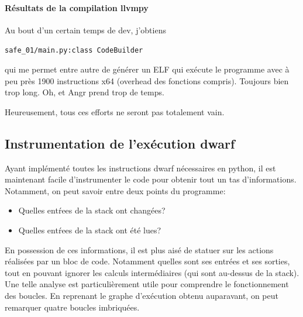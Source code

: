 \documentclass[14pt]{article}
\newcommand{\inlinebox}[2]{%
\colorbox{bg}{%
\parbox[b][0.6em]{\widthof{\texttt{#2}}}{\texttt{#2}}
}
}
\newcommand{\inlinebash}[1]{ \inlinebox{bash}{#1} }
\theoremstyle{definition}
\begin{document}
\paragraph{Résultats de la compilation llvmpy \\ }

Au bout d'un certain temps de dev, j'obtiens \inlinebash{safe_01/main.py:class CodeBuilder} qui me permet entre autre de générer un ELF qui exécute le programme avec à peu près 1900 instructions x64 (overhead des fonctions compris). Toujours bien trop long. Oh, et Angr prend trop de temps.

Heureusement, tous ces efforts ne seront pas totalement vain.

\subsection{Instrumentation de l'exécution dwarf}

Ayant implémenté toutes les instructions dwarf nécessaires en python, il est maintenant facile d'instrumenter le code pour obtenir tout un tas d'informations.
Notamment, on peut savoir entre deux points du programme:
\begin{itemize}
    \item Quelles entŕees de la stack ont changées?
    \item Quelles entŕees de la stack ont été lues?
\end{itemize}

En possession de ces informations, il est plus aisé de statuer sur les actions réalisées par un bloc de code. Notamment quelles sont ses entrées et ses sorties, tout en pouvant ignorer les calculs intermédiaires (qui sont au-dessus de la stack).
Une telle analyse est particulièrement utile pour comprendre le fonctionnement des boucles.
En reprenant le graphe d'exécution obtenu auparavant, on peut remarquer quatre boucles imbriquées.
\end{document}
